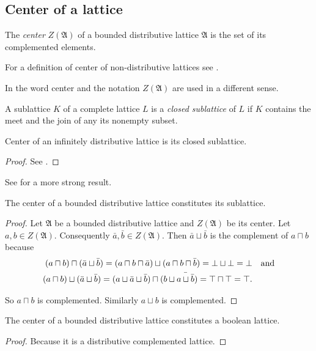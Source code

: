\subsection{Center of a lattice}
\begin{defn}
The \emph{center} $Z(\mathfrak{A})$ of a bounded
distributive lattice $\mathfrak{A}$ is the set of its complemented
elements.\end{defn}
\begin{rem}
For a definition of center of non-distributive lattices see \cite{neutralelements}.
\end{rem}

\begin{rem}
In \cite{ADTCGSBVA} the word center and the notation $Z(\mathfrak{A})$
are used in a different sense.\end{rem}
\begin{defn}
A sublattice $K$ of a complete lattice
$L$ is a \emph{closed sublattice} of $L$ if $K$ contains the meet
and the join of any its nonempty subset.\end{defn}
\begin{thm}
Center of an infinitely distributive lattice is its closed sublattice.\end{thm}
\begin{proof}
See \cite{center-inf-distr}.\end{proof}
\begin{rem}
See \cite{center-complete} for a more strong result.\end{rem}
\begin{thm}
The center of a bounded distributive lattice constitutes its sublattice.\end{thm}
\begin{proof}
Let $\mathfrak{A}$ be a bounded distributive lattice and $Z(\mathfrak{A})$
be its center. Let $a,b\in Z(\mathfrak{A})$. Consequently $\bar{a},\bar{b}\in Z(\mathfrak{A})$.
Then $\bar{a}\sqcup\bar{b}$ is the complement of $a\sqcap b$ because
\begin{align*}
(a\sqcap b)\sqcap(\bar{a}\sqcup\bar{b})=(a\sqcap b\sqcap\bar{a})\sqcup(a\sqcap b\sqcap\bar{b})=\bot\sqcup\bot=\bot & \text{\quad and}\\
(a\sqcap b)\sqcup(\bar{a}\sqcup\bar{b})=(a\sqcup\bar{a}\sqcup\bar{b})\sqcap(b\sqcup\bar{a\sqcup\bar{b}})=\top\sqcap\top=\top.
\end{align*}


So $a\sqcap b$ is complemented. Similarly $a\sqcup b$ is complemented.\end{proof}
\begin{thm}
\label{centr-bool}The center of a bounded distributive lattice constitutes
a boolean lattice.\end{thm}
\begin{proof}
Because it is a distributive complemented lattice.
\end{proof}

